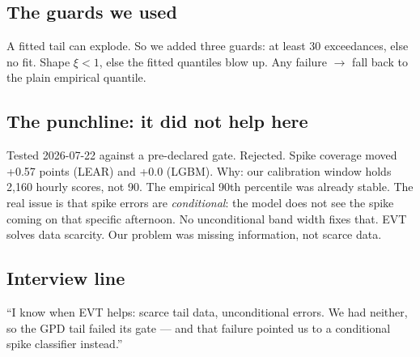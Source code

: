 \subsection{The guards we used}

A fitted tail can explode. So we added three guards:
at least 30 exceedances, else no fit.
Shape $\xi < 1$, else the fitted quantiles blow up.
Any failure $\to$ fall back to the plain empirical quantile.

\subsection{The punchline: it did not help here}

Tested 2026-07-22 against a pre-declared gate. Rejected.
Spike coverage moved +0.57 points (LEAR) and +0.0 (LGBM).
Why: our calibration window holds 2{,}160 hourly scores, not 90.
The empirical 90th percentile was already stable.
The real issue is that spike errors are \emph{conditional}:
the model does not see the spike coming on that specific afternoon.
No unconditional band width fixes that. EVT solves data scarcity.
Our problem was missing information, not scarce data.

\subsection{Interview line}

``I know when EVT helps: scarce tail data, unconditional errors.
We had neither, so the GPD tail failed its gate --- and that failure
pointed us to a conditional spike classifier instead.''
